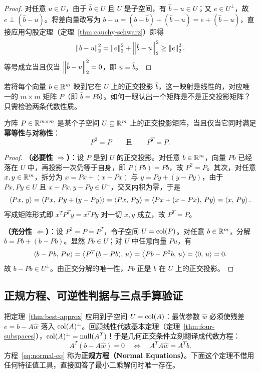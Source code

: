 \begin{proof}
对任意 $u \in U$，由于 $\hat{b} \in U$ 且 $U$ 是子空间，有 $\hat{b} - u \in U$；又 $e \in U^\perp$，故 $e \perp (\hat{b} - u)$。将差向量改写为 $b - u = (b - \hat{b}) + (\hat{b} - u) = e + (\hat{b} - u)$，直接应用勾股定理（定理~\ref{thm:cauchy-schwarz}）即得
\[
\left\|b - u\right\|_2^2 = \left\|e\right\|_2^2 + \left\|\hat{b} - u\right\|_2^2 \ge \left\|e\right\|_2^2.
\]
等号成立当且仅当 $\left\|\hat{b} - u\right\|_2^2 = 0$，即 $u = \hat{b}$。
\end{proof}

若将每个向量 $b \in \mathbb{R}^m$ 映到它在 $U$ 上的正交投影 $\hat{b}$，这一映射是线性的，对应唯一的 $m \times m$ 矩阵 $P$（即 $\hat{b} = Pb$）。如何一眼认出一个矩阵是不是正交投影矩阵？只需检验两条代数性质。

\begin{thmBox}
\begin{theorem}[正交投影矩阵的充要刻画]\label{thm:proj-matrix}
方阵 $P \in \mathbb{R}^{m \times m}$ 是某个子空间 $U \subseteq \mathbb{R}^m$ 上的正交投影矩阵，当且仅当它同时满足\textbf{幂等性}与\textbf{对称性}：
\[
P^2 = P \qquad \text{且} \qquad P^T = P.
\]
\end{theorem}
\end{thmBox}

\begin{proof}
\textbf{（必要性 $\Rightarrow$）}：设 $P$ 是到 $U$ 的正交投影。对任意 $b \in \mathbb{R}^m$，向量 $Pb$ 已经落在 $U$ 中，再投影一次仍等于自身，即 $P(Pb) = Pb$，故 $P^2 = P$。其次，对任意 $x, y \in \mathbb{R}^m$，拆分为 $x = Px + (x - Px)$ 与 $y = Py + (y - Py)$，由于 $Px, Py \in U$ 且 $x - Px, y - Py \in U^\perp$，交叉内积为零，于是
\[
\left\langle Px,\, y \right\rangle = \left\langle Px,\, Py + (y - Py) \right\rangle = \left\langle Px,\, Py \right\rangle = \left\langle Px + (x - Px),\, Py \right\rangle = \left\langle x,\, Py \right\rangle.
\]
写成矩阵形式即 $x^T P^T y = x^T P y$ 对一切 $x, y$ 成立，故 $P^T = P$。

\textbf{（充分性 $\Leftarrow$）}：设 $P^2 = P = P^T$，令子空间 $U = \operatorname{col}(P)$。对任意 $b \in \mathbb{R}^m$，分解 $b = Pb + (b - Pb)$。显然 $Pb \in U$；对 $U$ 中任意向量 $Pu$，有
\[
\left\langle b - Pb,\, Pu \right\rangle = \left\langle P^T(b - Pb),\, u \right\rangle = \left\langle Pb - P^2 b,\, u \right\rangle = \left\langle 0,\, u \right\rangle = 0.
\]
故 $b - Pb \in U^\perp$。由正交分解的唯一性，$Pb$ 正是 $b$ 在 $U$ 上的正交投影。
\end{proof}

\subsection{正规方程、可逆性判据与三点手算验证}

把定理~\ref{thm:best-approx} 应用到子空间 $U = \operatorname{col}(A)$：最优参数 $\hat{w}$ 必须使残差 $e = b - A\hat{w}$ 落入 $\operatorname{col}(A)^\perp$。回顾线性代数基本定理（定理~\ref{thm:four-subspaces}），$\operatorname{col}(A)^\perp = \operatorname{null}(A^T)$！于是几何正交条件立刻翻译成代数方程：
\begin{equation}\label{eq:normal-eq}
A^T (b - A\hat{w}) = 0 \quad \Longleftrightarrow \quad A^T A \hat{w} = A^T b.
\end{equation}
方程~\eqref{eq:normal-eq} 称为\textbf{正规方程（Normal Equations）}。下面这个定理不借用任何特征值工具，直接回答了最小二乘解何时唯一存在。

